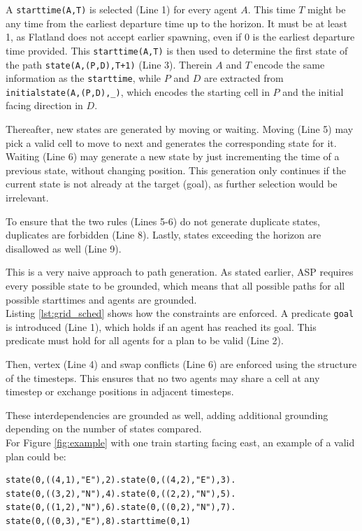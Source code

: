 \documentclass{llncs}
\begin{document}
\begin{multicols*}{2}
A \texttt{starttime(A,T)} is selected (Line 1) for every agent $A$. This time $T$ might be any time from the earliest departure time up to the horizon. It must be at least 1, as Flatland does not accept earlier spawning, even if 0 is the earliest departure time provided. This \texttt{starttime(A,T)} is then used to determine the first state of the path \texttt{state(A,(P,D),T+1)} (Line 3). Therein $A$ and $T$ encode the same information as the \texttt{starttime}, while $P$ and $D$ are extracted from \texttt{initialstate(A,(P,D),\_)}, which encodes the starting cell in $P$ and the initial facing direction in $D$.

Thereafter, new states are generated by moving or waiting. Moving (Line 5) may pick a valid cell to move to next and generates the corresponding state for it. Waiting (Line 6) may generate a new state by just incrementing the time of a previous state, without changing position. This generation only continues if the current state is not already at the target (goal), as further selection would be irrelevant.

To ensure that the two rules (Lines 5-6) do not generate duplicate states, duplicates are forbidden (Line 8). Lastly, states exceeding the horizon are disallowed as well (Line 9).

This is a very naive approach to path generation. As stated earlier, ASP requires every possible state to be grounded, which means that all possible paths for all possible starttimes and agents are grounded.\\

Listing \ref{lst:grid_sched} shows how the constraints are enforced. A predicate \texttt{goal} is introduced (Line 1), which holds if an agent has reached its goal. This predicate must hold for all agents for a plan to be valid (Line 2).

Then, vertex (Line 4) and swap conflicts (Line 6) are enforced using the structure of the timesteps. This ensures that no two agents may share a cell at any timestep or exchange positions in adjacent timesteps.

These interdependencies are grounded as well, adding additional grounding depending on the number of states compared.\\

For Figure \ref{fig:example} with one train starting facing east, an example of a valid plan could be:

\begin{small}
\begin{verbatim}
state(0,((4,1),"E"),2).state(0,((4,2),"E"),3).
state(0,((3,2),"N"),4).state(0,((2,2),"N"),5).
state(0,((1,2),"N"),6).state(0,((0,2),"N"),7).
state(0,((0,3),"E"),8).starttime(0,1)
\end{verbatim}
\end{small}


\end{multicols*}
\end{document}
